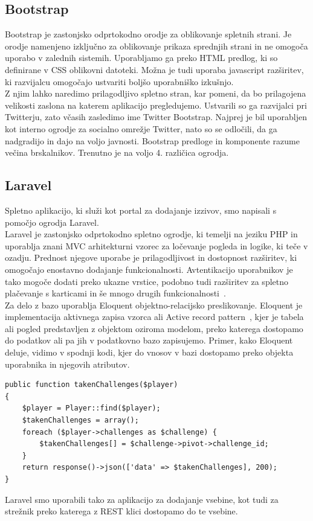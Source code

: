 \documentclass[a4paper, 12pt]{book}
\begin{document}
\subsection{Bootstrap}
Bootstrap je zastonjsko odprtokodno orodje za oblikovanje spletnih strani. Je orodje namenjeno izključno za oblikovanje prikaza sprednjih strani in ne omogoča uporabo v zalednih sistemih. Uporabljamo ga preko HTML predlog, ki so definirane v CSS oblikovni datoteki. Možna je tudi uporaba javascript razširitev, ki razvijalcu omogočajo ustvariti boljšo uporabniško izkušnjo.\\Z njim lahko naredimo prilagodljivo spletno stran, kar pomeni, da bo prilagojena velikosti zaslona na katerem aplikacijo pregledujemo. Ustvarili so ga razvijalci pri Twitterju, zato včasih zasledimo ime Twitter Bootstrap. Najprej je bil uporabljen kot interno ogrodje za socialno omrežje Twitter, nato so se odločili, da ga nadgradijo in dajo na voljo javnosti. Bootstrap predloge in komponente razume večina brskalnikov. Trenutno je na voljo 4. različica ogrodja.


\subsection{Laravel}
\label{laravelsubs}
Spletno aplikacijo, ki služi kot portal za dodajanje izzivov, smo napisali s pomočjo ogrodja Laravel.\\Laravel je zastonjsko odprtokodno spletno ogrodje, ki temelji na jeziku PHP in uporablja znani MVC arhitekturni vzorec za ločevanje pogleda in logike, ki teče v ozadju. Prednost njegove uporabe je prilagodljivost in dostopnost razširitev, ki omogočajo enostavno dodajanje funkcionalnosti. Avtentikacijo uporabnikov je tako mogoče dodati preko ukazne vrstice, podobno tudi razširitev za spletno plačevanje s karticami in še mnogo drugih funkcionalnosti~\cite{laravel}.\\Za delo z bazo uporablja Eloquent objektno-relacijsko preslikovanje. Eloquent je implementacija  aktivnega zapisa vzorca ali Active record pattern~\cite{activerecord}, kjer je tabela ali pogled predstavljen z objektom oziroma modelom, preko katerega dostopamo do podatkov ali pa jih v podatkovno bazo zapisujemo. Primer, kako Eloquent deluje, vidimo v spodnji kodi, kjer do vnosov v bazi dostopamo preko objekta uporabnika in njegovih atributov.
\begin{lstlisting}
public function takenChallenges($player)
{
    $player = Player::find($player);
    $takenChallenges = array();
    foreach ($player->challenges as $challenge) {
        $takenChallenges[] = $challenge->pivot->challenge_id;
    }  
    return response()->json(['data' => $takenChallenges], 200);
}
\end{lstlisting}
Laravel smo uporabili tako za aplikacijo za dodajanje vsebine, kot tudi za strežnik preko katerega z REST klici dostopamo do te vsebine.
\end{document}
